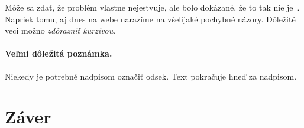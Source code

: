 \documentclass[10pt,twoside,slovak,a4paper]{article}
\begin{document}
Môže sa zdať, že problém vlastne nejestvuje\cite{Coplien:MPD}, ale bolo dokázané, že to tak nie je~\cite{Czarnecki:Staged, Czarnecki:Progress}. Napriek tomu, aj dnes na webe narazíme na všelijaké pochybné názory\cite{PLP-Framework}. Dôležité veci možno \emph{zdôrazniť kurzívou}.


\paragraph{Veľmi dôležitá poznámka.}
Niekedy je potrebné nadpisom označiť odsek. Text pokračuje hneď za nadpisom.








\section{Záver} \label{zaver} %






\end{document}
